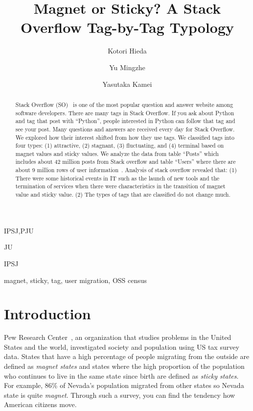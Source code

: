 \documentclass[english,preprint,JIP]{ipsj}
\begin{document}
\title{Magnet or Sticky? A Stack Overflow Tag-by-Tag Typology\\}


\author{Kotori Hieda}{IPSJ,PJU}
\author{Yu Mingzhe}{JU}
\author{Yasutaka Kamei}{IPSJ}


\begin{abstract}
Stack Overflow (SO)~\cite{nasehi2012makes} is one of the most popular question and answer website among software developers. There are many tags in Stack Overflow.  If you ask about Python and tag that post with ``Python'', people interested in Python can follow that tag and see your post. Many questions and answers are received every day for Stack Overflow. We explored how their interest shifted from how they use tags. We classified tags into four types: (1) attractive, (2) stagnant, (3) fluctuating, and (4) terminal based on magnet values and sticky values. We analyze the data from table ``Posts'' which includes about 42 million posts from Stack overflow and table ``Users'' where there are about 9 million rows of user information~\cite{baltes2018sotorrent}. Analysis of stack overflow revealed that: 
(1) There were some historical events in IT  such as the launch of new tools and the termination of services when there were characteristics in the transition of magnet value and sticky value.
(2) The types of tags that are classified do not change much.
\end{abstract}

\begin{keyword}
magnet, sticky, tag, user migration, OSS census
\end{keyword}

\maketitle

\section{Introduction}
Pew Research Center~\cite{communityeconomic}, an organization that studies problems in the United States and the world, investigated society and population using US tax survey data.  States that have a high percentage of people migrating from the outside are defined as \emph{magnet states} and states where the high proportion of the population who continues to live in the same state since birth are defined as \emph{sticky states}. For example, 86\% of Nevada's population migrated from other states so Nevada state is quite \emph{magnet}. Through such a survey, you can find the tendency how American citizens move.
\end{document}
